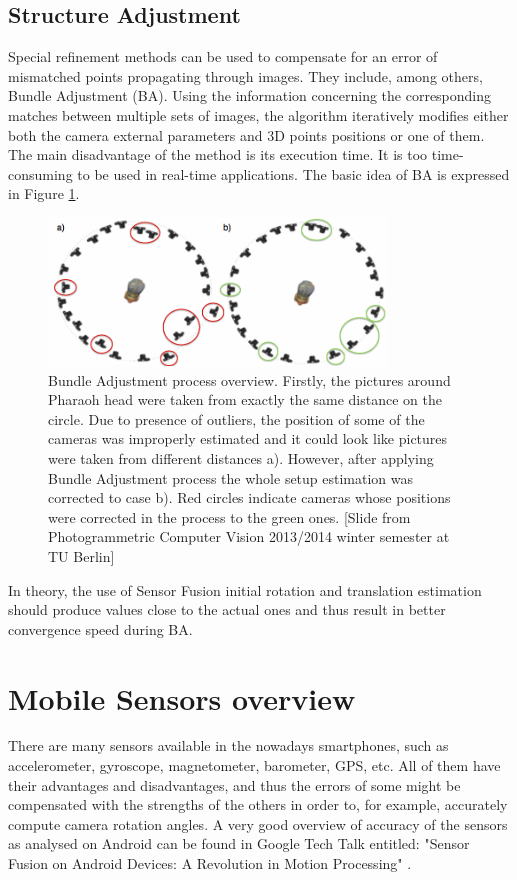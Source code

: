\subsection{Structure Adjustment}
Special refinement methods can be used to compensate for an error of mismatched points propagating through images. They include, among others, Bundle Adjustment (BA). Using the information concerning the corresponding matches between multiple sets of images, the algorithm iteratively modifies either both the camera external parameters and 3D points positions or one of them\cite{website:bundle-adjustment}. The main disadvantage of the method is its execution time. It is too time-consuming to be used in real-time applications. The basic idea of BA is expressed in Figure \ref{fig:BundleAdjustment}.
\begin{figure}[h]
    \centering
    \includegraphics[width=0.8\textwidth]{BundleAdjustment}
    \caption[Bundle Adjustment process overview]{Bundle Adjustment process overview. Firstly, the pictures around Pharaoh head were taken from exactly the same distance on the circle. Due to presence of outliers, the position of some of the cameras was improperly estimated and it could look like pictures were taken from different distances a). However, after applying Bundle Adjustment process the whole setup estimation was corrected to case b). Red circles indicate cameras whose positions were corrected in the process to the green ones. [Slide from Photogrammetric Computer Vision 2013/2014 winter semester at TU Berlin]}
    \label{fig:BundleAdjustment}
\end{figure}
In theory, the use of Sensor Fusion initial rotation and translation estimation should produce values close to the actual ones and thus result in better convergence speed during BA.
\section[Mobile Sensors overview]{Mobile Sensors overview\cite{website:androidSensorOverview}}
There are many sensors available in the nowadays smartphones, such as accelerometer, gyroscope, magnetometer, barometer, GPS, etc. All of them have their advantages and disadvantages, and thus the errors of some might be compensated with the strengths of the others in order to, for example, accurately compute camera rotation angles. A very good overview of accuracy of the sensors as analysed on Android can be found in Google Tech Talk entitled: "Sensor Fusion on Android Devices: A Revolution in Motion Processing" \cite{website:androidSensorFusion}.

